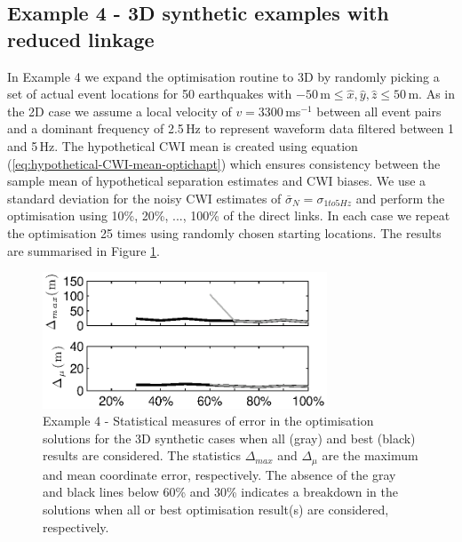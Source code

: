 \documentclass[extra]{gji}
\begin{document}
\subsection{Example 4 - 3D synthetic examples with reduced linkage}

In Example 4 we expand the optimisation routine to 3D by randomly picking
 a set of actual event locations for 50 earthquakes with
$-50$\,m$\leq \hat{x},\hat{y},\hat{z} \leq 50$\,m. As in the 2D case we assume a local velocity
of $v=3300\,$ms$^{-1}$ between all event pairs and a dominant frequency of 2.5$\,$Hz to represent
 waveform data filtered between 1 and 5$\,$Hz.
The hypothetical CWI mean is created using equation (\ref{eq:hypothetical-CWI-mean-optichapt})
which ensures consistency between the sample mean of hypothetical separation estimates and CWI
biases. We use a standard deviation for the noisy CWI estimates
of $\bar{\sigma}_N = \sigma_{1to5Hz}$ and perform the optimisation using 10\%,
20\%, ..., 100\% of the direct links.
In each case we repeat the
optimisation 25 times using randomly chosen starting locations. The results are
summarised in Figure \ref{fig:optimisationresults-3Dsynth}.

\begin{figure}
\noindent\includegraphics[width =
20pc]{diags/synth3Dmulti/ressummary_3Dsynth50eq.eps}
\caption{Example 4 - Statistical measures of error in the
optimisation solutions for the 3D synthetic cases when all (gray)
and best (black) results are considered. The statistics
$\Delta_{max}$ and $\Delta_\mu$ are the maximum and mean coordinate
error, respectively. The absence of the gray and black lines below
60\% and 30\% indicates a breakdown in the solutions when all or
best optimisation result(s) are considered, respectively.}
\label{fig:optimisationresults-3Dsynth}
\end{figure}
\end{document}
